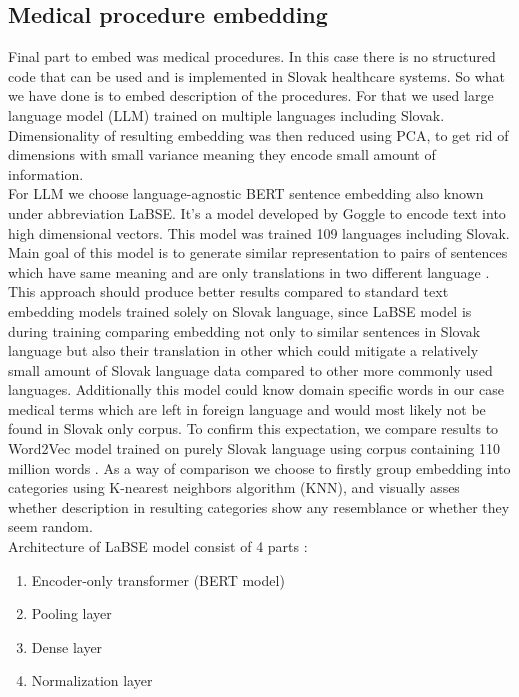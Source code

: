 \subsection{Medical procedure embedding}
\label{procedureEmb}

Final part to embed was medical procedures. In this case there is no structured code that can be used and is implemented in Slovak healthcare systems. So what we have done is to embed description of the procedures. For that we used large language model (LLM) trained on multiple languages including Slovak. Dimensionality of resulting embedding was then reduced using PCA, to get rid of dimensions with small variance meaning they encode small amount of information. 
\\

For LLM we choose language-agnostic BERT sentence embedding also known under abbreviation LaBSE. It's a model developed by Goggle to encode text into high dimensional vectors. This model was trained 109 languages including Slovak. Main goal of this model is to generate similar representation to pairs of sentences which have same meaning and are only translations in two different language \cite{labse_kaggle}. This approach should produce better results compared to standard text embedding models trained solely on Slovak language, since LaBSE model is during training comparing embedding not only to similar sentences in Slovak language but also their translation in other which could mitigate a relatively small amount of Slovak language data compared to other more commonly used languages. Additionally this model could know domain specific words in our case medical terms which are left in foreign language and would most likely not be found in Slovak only corpus. To confirm this expectation, we compare results to Word2Vec model trained on purely Slovak language using corpus containing 110 million words \cite{word2vec}. As a way of comparison we choose to  firstly group embedding into categories using K-nearest neighbors algorithm (KNN), and visually asses whether description in resulting categories show any resemblance or whether they seem random. 
\\
Architecture of LaBSE model consist of 4 parts \cite{labse_hug}:

\begin{enumerate}
	\item Encoder-only transformer (BERT model)
	\item Pooling layer
	\item Dense layer
	\item Normalization layer
\end{enumerate}

